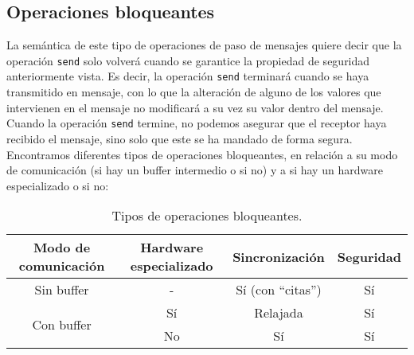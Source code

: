 \subsection{Operaciones bloqueantes}
La semántica de este tipo de operaciones de paso de mensajes quiere decir que la operación \verb|send| solo volverá cuando se garantice la propiedad de seguridad anteriormente vista. Es decir, la operación \verb|send| terminará cuando se haya transmitido en mensaje, con lo que la alteración de alguno de los valores que intervienen en el mensaje no modificará a su vez su valor dentro del mensaje. Cuando la operación \verb|send| termine, no podemos asegurar que el receptor haya recibido el mensaje, sino solo que este se ha mandado de forma segura.\\

Encontramos diferentes tipos de operaciones bloqueantes, en relación a su modo de comunicación (si hay un buffer intermedio o si no) y a si hay un hardware especializado o si no:
\begin{table}[H]
\centering
\begin{tabular}{|c|c|c|c|}
    \hline
    Modo de comunicación & Hardware especializado & Sincronización & Seguridad \\
    \hline
    Sin buffer & - & Sí (con ``citas'') & Sí \\
    \hline
    \multirow{2}{*}{Con buffer} & Sí & Relajada & Sí \\
    \cline{2-4}
    & No & Sí & Sí \\
    \hline
\end{tabular}
\caption{Tipos de operaciones bloqueantes.}
\end{table}

